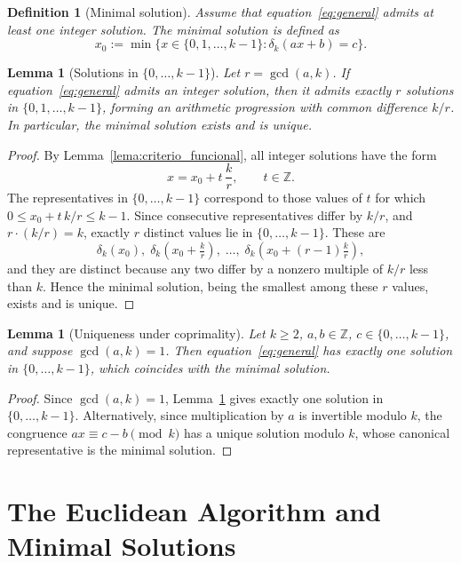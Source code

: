 \documentclass[12pt]{article}
\newtheorem{lemma}[theorem]{Lemma}
\newtheorem{definition}[theorem]{Definition}
\begin{document}
\begin{definition}[Minimal solution]\label{def:minima}
Assume that equation~\eqref{eq:general} admits at least one integer solution.
The \emph{minimal solution} is defined as
\[
x_0 :=
\min\bigl\{x \in \{0,1,\dots,k-1\} : \delta_k(ax+b)=c\bigr\}.
\]
\end{definition}

\begin{lemma}[Solutions in $\{0,\dots,k-1\}$]\label{lem:minimal_unique}
Let $r = \gcd(a,k)$. If equation~\eqref{eq:general} admits an integer
solution, then it admits exactly $r$ solutions in $\{0,1,\dots,k-1\}$,
forming an arithmetic progression with common difference $k/r$.
In particular, the minimal solution exists and is unique.
\end{lemma}


\begin{proof}
By Lemma~\ref{lema:criterio_funcional}, all integer solutions have the form
\[
x = x_0 + t\,\frac{k}{r}, \qquad t \in \mathbb{Z}.
\]
The representatives in $\{0,\dots,k-1\}$ correspond to those values of $t$
for which $0 \le x_0 + t\,k/r \le k-1$.
Since consecutive representatives differ by $k/r$, and
$r \cdot (k/r) = k$, exactly $r$ distinct values lie in $\{0,\dots,k-1\}$.
These are
\[
\delta_k(x_0),\;
\delta_k\!\left(x_0 + \tfrac{k}{r}\right),\;
\dots,\;
\delta_k\!\left(x_0 + (r-1)\tfrac{k}{r}\right),
\]
and they are distinct because any two differ by a nonzero multiple of $k/r$
less than $k$.
Hence the minimal solution, being the smallest among these $r$ values,
exists and is unique.
\end{proof}

\begin{lemma}[Uniqueness under coprimality]\label{lema:unicidad_ep}
Let $k \ge 2$, $a,b \in \mathbb{Z}$, $c \in \{0,\dots,k-1\}$, and suppose
$\gcd(a,k)=1$. Then equation~\eqref{eq:general} has exactly one solution
in $\{0,\dots,k-1\}$, which coincides with the minimal solution.
\end{lemma}

\begin{proof}
Since $\gcd(a,k)=1$, Lemma~\ref{lem:minimal_unique} gives exactly one
solution in $\{0,\dots,k-1\}$. Alternatively, since multiplication by $a$
is invertible modulo $k$, the congruence $ax \equiv c-b \pmod{k}$ has a
unique solution modulo $k$, whose canonical representative is the minimal
solution.
\end{proof}

\section{The Euclidean Algorithm and Minimal Solutions}
\label{sec:euclidean}
\end{document}
